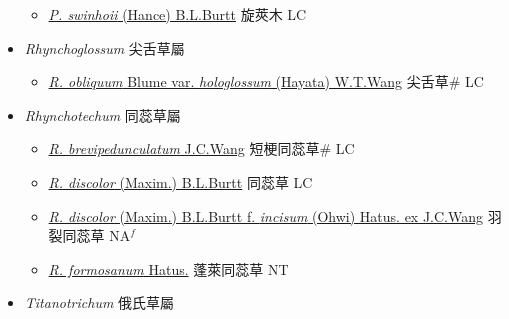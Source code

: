 \begin{itemize}
  \begin{itemize}
        \item[] \href{http://www.theplantlist.org/tpl1.1/search?q=Paraboea+swinhoii}{\textit{P. swinhoii} (Hance) B.L.Burtt}   旋莢木 LC
  \end{itemize}
 \item[] \textit{Rhynchoglossum} 尖舌草屬
                    
  \begin{itemize}
        \item[] \href{http://www.theplantlist.org/tpl1.1/search?q=Rhynchoglossum+obliquum+var.+hologlossum}{\textit{R. obliquum} Blume var. \textit{hologlossum} (Hayata) W.T.Wang}   尖舌草\# LC
  \end{itemize}
 \item[] \textit{Rhynchotechum} 同蕊草屬
                    
  \begin{itemize}
        \item[] \href{http://www.theplantlist.org/tpl1.1/search?q=Rhynchotechum+brevipedunculatum}{\textit{R. brevipedunculatum} J.C.Wang}   短梗同蕊草\# LC
        \item[] \href{http://www.theplantlist.org/tpl1.1/search?q=Rhynchotechum+discolor}{\textit{R. discolor} (Maxim.) B.L.Burtt}   同蕊草 LC
        \item[] \href{http://www.theplantlist.org/tpl1.1/search?q=Rhynchotechum+discolor+ f. +incisum}{\textit{R. discolor} (Maxim.) B.L.Burtt  f.  \textit{incisum} (Ohwi) Hatus. ex J.C.Wang}   羽裂同蕊草 NA$^f$
        \item[] \href{http://www.theplantlist.org/tpl1.1/search?q=Rhynchotechum+formosanum}{\textit{R. formosanum} Hatus.}   蓬萊同蕊草 NT
  \end{itemize}
 \item[] \textit{Titanotrichum} 俄氏草屬
                    

\end{itemize}
